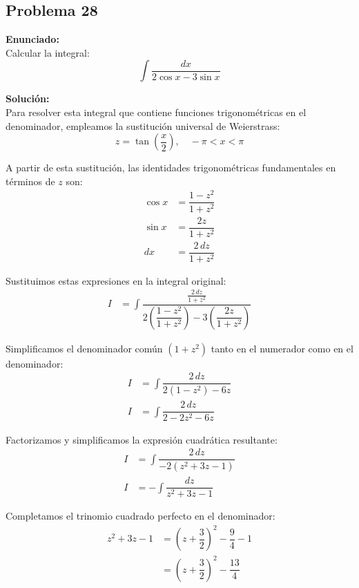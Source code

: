 \subsection*{Problema 28}

\textbf{Enunciado:} \\
Calcular la integral:
\begin{equation*}
\int \dfrac{dx}{2\cos x - 3\sin x}
\end{equation*}

\textbf{Solución:} \\
Para resolver esta integral que contiene funciones trigonométricas en el denominador, empleamos la sustitución universal de Weierstrass:
\begin{equation*}
z = \tan\left(\dfrac{x}{2}\right), \quad -\pi < x < \pi
\end{equation*}

A partir de esta sustitución, las identidades trigonométricas fundamentales en términos de $z$ son:
\begin{align*}
\cos x &= \dfrac{1 - z^2}{1 + z^2} \\
\sin x &= \dfrac{2z}{1 + z^2} \\
dx &= \dfrac{2 \, dz}{1 + z^2}
\end{align*}

Sustituimos estas expresiones en la integral original:
\begin{align*}
I &= \int \dfrac{\frac{2 \, dz}{1 + z^2}}{2\left(\dfrac{1 - z^2}{1 + z^2}\right) - 3\left(\dfrac{2z}{1 + z^2}\right)}
\end{align*}

Simplificamos el denominador común $(1 + z^2)$ tanto en el numerador como en el denominador:
\begin{align*}
I &= \int \dfrac{2 \, dz}{2(1 - z^2) - 6z} \\
I &= \int \dfrac{2 \, dz}{2 - 2z^2 - 6z}
\end{align*}

Factorizamos y simplificamos la expresión cuadrática resultante:
\begin{align*}
I &= \int \dfrac{2 \, dz}{-2(z^2 + 3z - 1)} \\
I &= -\int \dfrac{dz}{z^2 + 3z - 1}
\end{align*}

Completamos el trinomio cuadrado perfecto en el denominador:
\begin{align*}
z^2 + 3z - 1 &= \left(z + \dfrac{3}{2}\right)^2 - \dfrac{9}{4} - 1 \\
&= \left(z + \dfrac{3}{2}\right)^2 - \dfrac{13}{4}
\end{align*}

